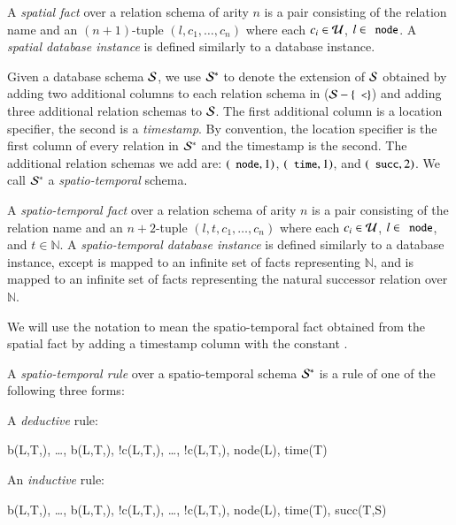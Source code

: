 A {\em spatial fact} over a relation schema of arity $n$ is a pair consisting of the relation name and an $(n+1)$-tuple $(l,c_1,\ldots,c_n)$ where each $c_i \in \univ$, $l \in \dedalus{node}$.  A {\em spatial database instance} is defined similarly to a database instance.

Given a database schema $\schema$, we use $\stschema$ to denote the extension of
$\schema$ obtained by adding two additional columns to each relation schema in ($\schema - \{\dedalus{<}\}$) and adding three additional relation schemas to $\schema$. 
The first additional column is a location specifier, the second is a {\em timestamp}.  By convention, the location specifier is the first column of every relation in $\stschema$ and the timestamp is the second.  
The additional relation schemas we add are: $(\dedalus{node},1)$,
$(\dedalus{time},1)$, and $(\dedalus{succ},2)$.
We call $\stschema$ a {\em spatio-temporal} schema.

A {\em spatio-temporal fact} over a relation schema of arity $n$ is a pair consisting of the relation name and an $n+2$-tuple $(l,t,c_1,\ldots,c_n)$ where each $c_i \in \univ$, $l \in \dedalus{node}$, and $t \in \mathbb{N}$.  A {\em spatio-temporal database instance} is defined similarly to a database instance, except  is mapped to an infinite set of  facts representing $\mathbb{N}$, and  is mapped to an infinite set of  facts representing the natural successor relation over $\mathbb{N}$.

We will use the notation  to mean the spatio-temporal fact obtained from the spatial fact  by adding a timestamp column with the constant .

A {\em spatio-temporal rule} over a spatio-temporal schema $\stschema$ is a rule of one of the following three forms:

A {\em deductive} rule:

\begin{Drules}
        {b(L,T,), \ldots, b(L,T,), !c(L,T,), \ldots, !c(L,T,), node(L), time(T)}
\end{Drules}

An {\em inductive} rule:

\begin{Drules}
        {b(L,T,), \ldots, b(L,T,), !c(L,T,), \ldots, !c(L,T,), node(L), time(T), succ(T,S)}
\end{Drules}

